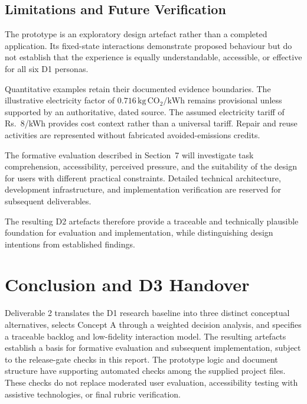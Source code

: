 \documentclass[12pt,a4paper]{article}
\begin{document}
\subsection{Limitations and Future Verification}

The prototype is an exploratory design artefact rather than a completed application. Its fixed-state interactions demonstrate proposed behaviour but do not establish that the experience is equally understandable, accessible, or effective for all six D1 personas.

Quantitative examples retain their documented evidence boundaries. The illustrative electricity factor of $0.716\,\mathrm{kg\,CO_2/kWh}$ remains provisional unless supported by an authoritative, dated source. The assumed electricity tariff of Rs.~8/kWh provides cost context rather than a universal tariff. Repair and reuse activities are represented without fabricated avoided-emissions credits.

The formative evaluation described in Section~7 will investigate task comprehension, accessibility, perceived pressure, and the suitability of the design for users with different practical constraints. Detailed technical architecture, development infrastructure, and implementation verification are reserved for subsequent deliverables.

The resulting D2 artefacts therefore provide a traceable and technically plausible foundation for evaluation and implementation, while distinguishing design intentions from established findings.

\clearpage
\section{Conclusion and D3 Handover}
Deliverable 2 translates the D1 research baseline into three distinct conceptual alternatives, selects Concept A through a weighted decision analysis, and specifies a traceable backlog and low-fidelity interaction model. The resulting artefacts establish a basis for formative evaluation and subsequent implementation, subject to the release-gate checks in this report. The prototype logic and document structure have supporting automated checks among the supplied project files. These checks do not replace moderated user evaluation, accessibility testing with assistive technologies, or final rubric verification.
\end{document}
